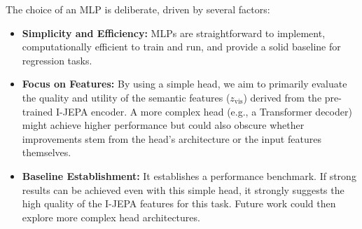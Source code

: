\documentclass{article}
\begin{document}
The choice of an MLP is deliberate, driven by several factors:
\begin{itemize}
    \item \textbf{Simplicity and Efficiency:} MLPs are straightforward to implement, computationally efficient to train and run, and provide a solid baseline for regression tasks.
    \item \textbf{Focus on Features:} By using a simple head, we aim to primarily evaluate the quality and utility of the semantic features ($z_{\text{vis}}$) derived from the pre-trained I-JEPA encoder. A more complex head (e.g., a Transformer decoder) might achieve higher performance but could also obscure whether improvements stem from the head's architecture or the input features themselves.
    \item \textbf{Baseline Establishment:} It establishes a performance benchmark. If strong results can be achieved even with this simple head, it strongly suggests the high quality of the I-JEPA features for this task. Future work could then explore more complex head architectures.
\end{itemize}
\end{document}

